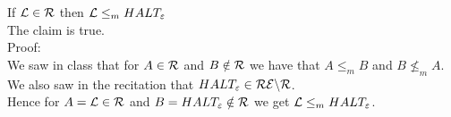 If $\mathcal{L} \in \mathcal{R}$ then $\mathcal{L} \leq_m HALT_\varepsilon$ \\
The claim is true. \\

Proof: \\
We saw in class that for $A \in \mathcal{R}$ and $B \notin \mathcal{R}$ we have that $A \leq_m B$ and $B \nleq_m A$. \\
We also saw in the recitation that $HALT_\varepsilon \in \mathcal{R}\mathcal{E} \backslash \mathcal{R}$.  \\
Hence for $A = \mathcal{L} \in \mathcal{R}$ and $B = HALT_\varepsilon \notin \mathcal{R}$ we get $\mathcal{L} \leq_m HALT_\varepsilon$. \\
